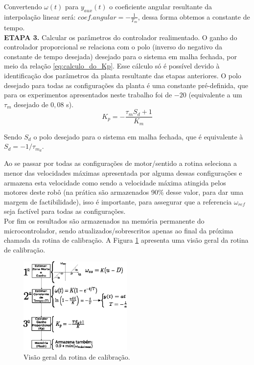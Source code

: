 Convertendo $\omega(t)$ para $y_{aux}(t)$ o coeficiente angular resultante da interpolação linear será: $coef.angular = -\frac{1}{T_m}$, dessa forma obtemos a constante de tempo.\\

\textbf{ETAPA 3.} Calcular os parâmetros do controlador realimentado. O ganho do controlador proporcional se relaciona com o polo (inverso do negativo da constante de tempo desejada) desejado para o sistema em malha fechada, por meio da relação \ref{eq:calculo_do_Kp}. Esse cálculo só é possível devido à identificação dos parâmetros da planta resultante das etapas anteriores. O polo desejado para todas as configurações da planta é uma constante pré-definida, que para os experimentos apresentados neste trabalho foi de $-20$ (equivalente a um $\tau_m$ desejado de $0,08$ s).\\

\begin{equation}
    K_p = -\frac{\tau_m S_d + 1}{K_m}
    \label{eq:calculo_do_Kp}
\end{equation}

Sendo $S_d$ o polo desejado para o sistema em malha fechada, que é equivalente à $S_d = -1/\tau_{m_{d}}$.
    

Ao se passar por todas as configurações de motor/sentido a rotina seleciona a menor das velocidades máximas apresentada por alguma dessas configurações e armazena esta velocidade como sendo a velocidade máxima atingida pelos motores deste robô (na prática são armazenados 90\% desse valor, para dar uma margem de factibilidade), isso é importante, para assegurar que a referencia $\omega_{ref}$ seja factível para todas as configurações. \\

Por fim os resultados são armazenados na memória permanente do microcontrolador, sendo atualizados/sobrescritos apenas ao final da próxima chamada da rotina de calibração. A Figura \ref{fig:rotina_calibracao} apresenta uma visão geral da rotina de calibração.

\begin{figure}[H]
    \centering
    \includegraphics[width=0.5\textwidth]{figuras/ilustracoes/rotina_de_calibracao.eps}
    \caption{Visão geral da rotina de calibração.}
    \label{fig:rotina_calibracao}
\end{figure}
